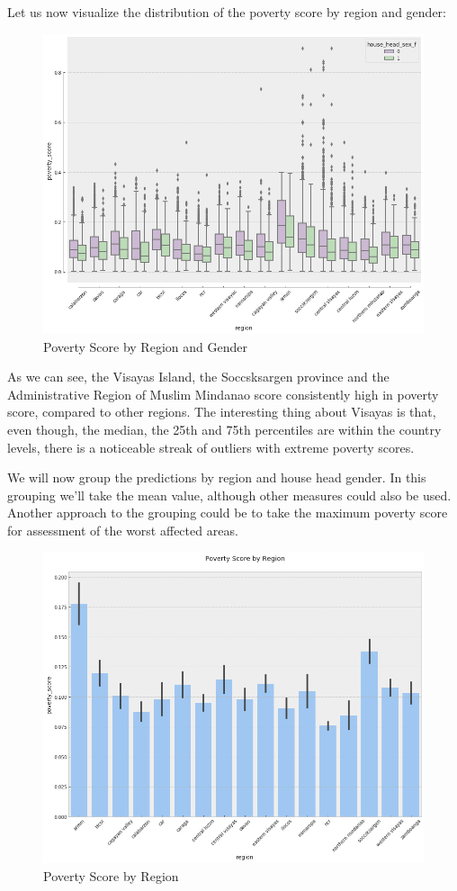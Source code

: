 \documentclass{article}
\begin{document}
Let us now visualize the distribution of the poverty score by region and gender:

\begin{figure}[H]
\caption{Poverty Score by Region and Gender}
\centering
\includegraphics[width = 0.7 \textwidth]{poverty_score_region_gender}
\end{figure}

As we can see, the Visayas Island, the Soccsksargen province and the Administrative Region of Muslim Mindanao score consistently high in poverty score, compared to other regions. The interesting thing about Visayas is that, even though, the median, the 25th and 75th percentiles are within the country levels, there is a noticeable streak of outliers with extreme poverty scores.

We will now group the predictions by region and house head gender. In this grouping we'll take the mean value, although other measures could also be used. Another approach to the grouping could be to take the maximum poverty score for assessment of the worst affected areas.

\begin{figure}[H]
\caption{Poverty Score by Region}
\centering
\includegraphics[width = 0.7 \textwidth]{poverty_score_region}
\end{figure}
\end{document}
